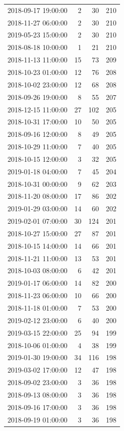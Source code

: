 \begin{tabular}{lrrr}
2018-09-17 19:00:00 & 2 & 30 & 210 \\
2018-11-27 06:00:00 & 2 & 30 & 210 \\
2019-05-23 15:00:00 & 2 & 30 & 210 \\
2018-08-18 10:00:00 & 1 & 21 & 210 \\
2018-11-13 11:00:00 & 15 & 73 & 209 \\
2018-10-23 01:00:00 & 12 & 76 & 208 \\
2018-10-02 23:00:00 & 12 & 68 & 208 \\
2018-09-26 19:00:00 & 8 & 55 & 207 \\
2018-12-15 11:00:00 & 27 & 102 & 205 \\
2018-10-31 17:00:00 & 10 & 50 & 205 \\
2018-09-16 12:00:00 & 8 & 49 & 205 \\
2018-10-29 11:00:00 & 7 & 40 & 205 \\
2018-10-15 12:00:00 & 3 & 32 & 205 \\
2019-01-18 04:00:00 & 7 & 45 & 204 \\
2018-10-31 00:00:00 & 9 & 62 & 203 \\
2018-11-20 08:00:00 & 17 & 86 & 202 \\
2019-01-29 03:00:00 & 14 & 60 & 202 \\
2019-02-01 07:00:00 & 30 & 124 & 201 \\
2018-10-27 15:00:00 & 27 & 87 & 201 \\
2018-10-15 14:00:00 & 14 & 66 & 201 \\
2018-11-21 11:00:00 & 13 & 53 & 201 \\
2018-10-03 08:00:00 & 6 & 42 & 201 \\
2019-01-17 06:00:00 & 14 & 82 & 200 \\
2018-11-23 06:00:00 & 10 & 66 & 200 \\
2018-11-18 01:00:00 & 7 & 53 & 200 \\
2019-02-12 23:00:00 & 6 & 40 & 200 \\
2019-03-15 22:00:00 & 25 & 94 & 199 \\
2018-10-06 01:00:00 & 4 & 38 & 199 \\
2019-01-30 19:00:00 & 34 & 116 & 198 \\
2019-03-02 17:00:00 & 12 & 47 & 198 \\
2018-09-02 23:00:00 & 3 & 36 & 198 \\
2018-09-13 08:00:00 & 3 & 36 & 198 \\
2018-09-16 17:00:00 & 3 & 36 & 198 \\
2018-09-19 01:00:00 & 3 & 36 & 198 \\

\end{tabular}
